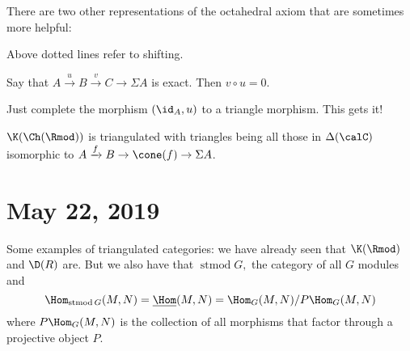 \documentclass[12pt]{article}
\DeclareMathOperator{\stmod}{stmod}
\begin{document}
\begin{rmk}
There are two other representations of the octahedral axiom that are sometimes more helpful:
\begin{center}
\end{center}

\begin{center}
\end{center}

\begin{center}
\end{center}
Above dotted lines refer to shifting.
\end{rmk}
\begin{lem}
	Say that $A\xrightarrow{u}B\xrightarrow{v}C\to\Sigma A$ is exact. Then $v\circ u=0$.
\end{lem}
\begin{prf}
	Just complete the morphism $(\id_A,u)$ to a triangle morphism. This gets it!
\end{prf}
\begin{ex}
	$\K(\Ch(\Rmod))$ is triangulated with triangles being all those in $\Delta(\calC)$ isomorphic to $A\xrightarrow{f}B\to \cone(f)\to \Sigma A$.
\end{ex}

\section{May 22, 2019}
Some examples of triangulated categories: we have already seen that $\K(\Rmod)$ and $\D(R)$ are. But we also have
that $\stmod G,$ the category of all $G$ modules and 
\[\Hom_{\stmod G}(M,N)=\underline{\Hom}(M,N)=\Hom_G(M,N)/P\Hom_G(M,N)\]
where $P\Hom_G(M,N)$ is the collection of all morphisms that factor through a projective object $P$.
\end{document}
